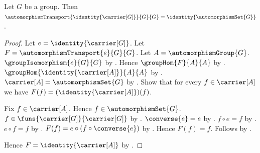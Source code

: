 \begin{theorem}\label{automorphism_transport_identity}
    Let $G$ be a group.
    Then
        $\automorphismTransport{\identity{\carrier[G]}}{G}{G}
            =\identity{\automorphismSet{G}}$.
\end{theorem}
\begin{proof}
    Let $e=\identity{\carrier[G]}$.
    Let $F=\automorphismTransport{e}{G}{G}$.
    Let $A=\automorphismGroup{G}$.
    $\groupIsomorphism{e}{G}{G}$ by
        .
    Hence $\groupHom{F}{A}{A}$ by
        .
    $\groupHom{\identity{\carrier[A]}}{A}{A}$ by
        .
    $\carrier[A]=\automorphismSet{G}$ by
        .
    Show that for every $f\in\carrier[A]$ we have
        $F(f)=(\identity{\carrier[A]})(f)$.
    \begin{subproof}
        Fix $f\in\carrier[A]$.
        Hence $f\in\automorphismSet{G}$.
        $f\in\funs{\carrier[G]}{\carrier[G]}$ by
            .
        $\converse{e}=e$ by .
        $f\circ e=f$ by .
        $e\circ f=f$ by .
        $F(f)=e\circ(f\circ\converse{e})$ by
            .
        Hence $F(f)=f$.
        Follows by .
    \end{subproof}
    Hence $F=\identity{\carrier[A]}$ by
        .
\end{proof}


